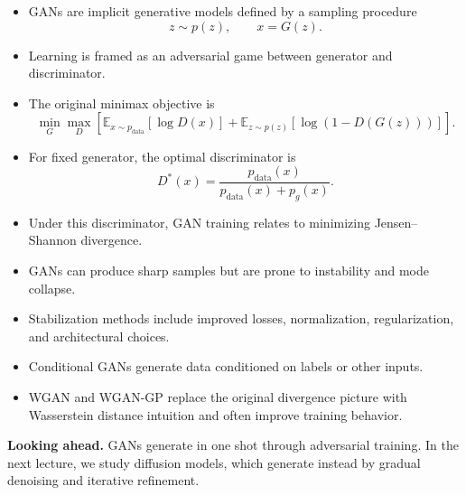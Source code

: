 \begin{itemize}
    \item GANs are implicit generative models defined by a sampling procedure
    \[
    z\sim p(z), \qquad x=G(z).
    \]
    \item Learning is framed as an adversarial game between generator and discriminator.
    \item The original minimax objective is
    \[
    \min_G \max_D
    \left[
    \mathbb{E}_{x\sim p_{\text{data}}}[\log D(x)]
    +
    \mathbb{E}_{z\sim p(z)}[\log(1-D(G(z)))]
    \right].
    \]
    \item For fixed generator, the optimal discriminator is
    \[
    D^*(x)=\frac{p_{\text{data}}(x)}{p_{\text{data}}(x)+p_g(x)}.
    \]
    \item Under this discriminator, GAN training relates to minimizing Jensen--Shannon divergence.
    \item GANs can produce sharp samples but are prone to instability and mode collapse.
    \item Stabilization methods include improved losses, normalization, regularization, and architectural choices.
    \item Conditional GANs generate data conditioned on labels or other inputs.
    \item WGAN and WGAN-GP replace the original divergence picture with Wasserstein distance intuition and often improve training behavior.
\end{itemize}

\medskip

\noindent
\textbf{Looking ahead.}
GANs generate in one shot through adversarial training. In the next lecture, we study diffusion models, which generate instead by gradual denoising and iterative refinement.